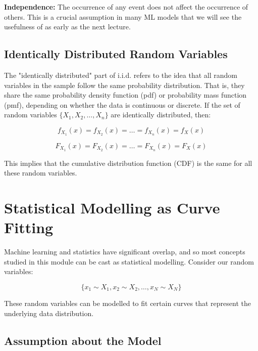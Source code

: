 \textbf{Independence:} The occurrence of any event does not affect the occurrence of others. This is a crucial assumption in many ML models that we will see the usefulness of as early as the next lecture.

\subsection{Identically Distributed Random Variables}

The "identically distributed" part of i.i.d. refers to the idea that all random variables in the sample follow the same probability distribution. That is, they share the same probability density function (pdf) or probability mass function (pmf), depending on whether the data is continuous or discrete. If the set of random variables \(\{X_1, X_2, \ldots, X_n\}\) are identically distributed, then:





\begin{equation}
    f_{X_1}(x) = f_{X_2}(x) = \ldots = f_{X_n}(x) = f_{X}(x)
\end{equation}

\begin{equation}
F_{X_1}(x) = F_{X_2}(x) = \ldots = F_{X_n}(x) = F_{X}(x)
\end{equation}

\noindent This implies that the cumulative distribution function (CDF) is the same for all these random variables.


\section{Statistical Modelling as Curve Fitting}

Machine learning and statistics have significant overlap, and so most concepts studied in this module can be cast as statistical modelling. Consider our random variables:

\begin{equation}
\{x_1 \sim X_1, x_2 \sim X_2, \ldots, x_N \sim X_N\}
\end{equation}

\noindent These random variables can be modelled to fit certain curves that represent the underlying data distribution. 

\subsection{Assumption about the Model}

